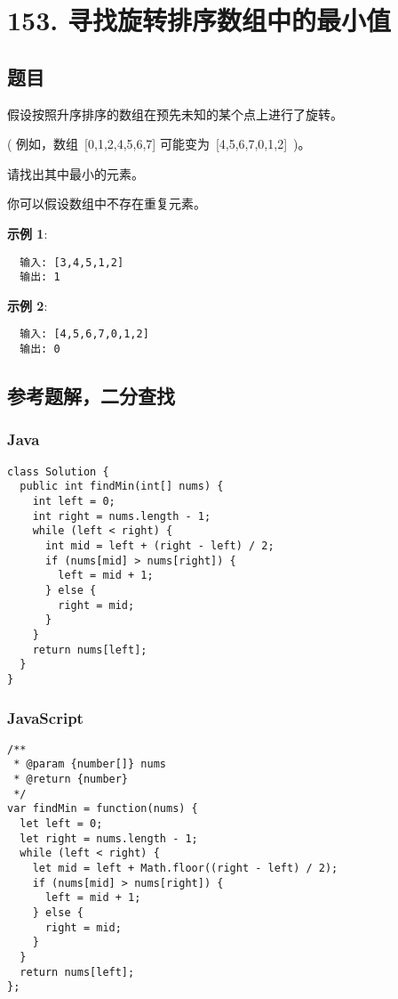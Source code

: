 \newpage
\section{153. 寻找旋转排序数组中的最小值}
\label{leetcode:153}

\subsection{题目}

假设按照升序排序的数组在预先未知的某个点上进行了旋转。

( 例如，数组 [0,1,2,4,5,6,7] 可能变为 [4,5,6,7,0,1,2] )。

请找出其中最小的元素。

你可以假设数组中不存在重复元素。

\textbf{示例 1}:

\begin{verbatim}
  输入: [3,4,5,1,2]
  输出: 1
\end{verbatim}

\textbf{示例 2}:

\begin{verbatim}
  输入: [4,5,6,7,0,1,2]
  输出: 0
\end{verbatim}

\subsection{参考题解，二分查找}

\subsubsection{Java}

\begin{verbatim}
class Solution {
  public int findMin(int[] nums) {
    int left = 0;
    int right = nums.length - 1;
    while (left < right) {
      int mid = left + (right - left) / 2;
      if (nums[mid] > nums[right]) {
        left = mid + 1;
      } else {
        right = mid;
      }
    }
    return nums[left];
  }
}
\end{verbatim}

\subsubsection{JavaScript}

\begin{verbatim}
/**
 * @param {number[]} nums
 * @return {number}
 */
var findMin = function(nums) {
  let left = 0;
  let right = nums.length - 1;
  while (left < right) {
    let mid = left + Math.floor((right - left) / 2);
    if (nums[mid] > nums[right]) {
      left = mid + 1;
    } else {
      right = mid;
    }
  }
  return nums[left];
};
\end{verbatim}
